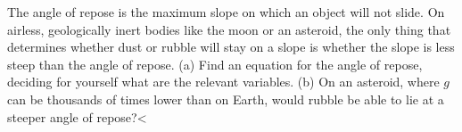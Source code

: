         The angle of repose is the maximum slope on which an
        object will not slide. On airless, geologically inert bodies
        like the moon or an asteroid, the only thing that determines
        whether dust or rubble will stay on a slope is whether the
        slope is less steep than the angle of repose. \hwendpart
        (a) Find an
        equation for the angle of repose, deciding for yourself what
        are the relevant variables.\hwendpart
         (b) On an asteroid, where $g$ can
        be thousands of times lower than on Earth, would rubble be
        able to lie at a steeper angle of repose?<%
